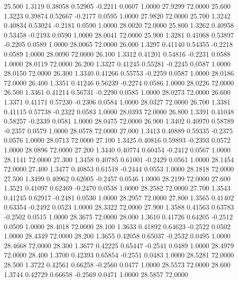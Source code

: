   25.500   1.3119   0.38058   0.52905  -0.2211   0.0607   1.0000  27.9299  72.0000
  25.600   1.3223   0.39874   0.52667  -0.2177   0.0595   1.0000  27.9820  72.0000
  25.700   1.3242   0.40834   0.53024  -0.2181   0.0590   1.0000  28.0020  72.0000
  25.800   1.3262   0.40958   0.53458  -0.2193   0.0590   1.0000  28.0041  72.0000
  25.900   1.3281   0.41068   0.53897  -0.2205   0.0589   1.0000  28.0065  72.0000
  26.000   1.3297   0.41140   0.54355  -0.2218   0.0589   1.0000  28.0090  72.0000
  26.100   1.3312   0.41201   0.54816  -0.2231   0.0588   1.0000  28.0119  72.0000
  26.200   1.3327   0.41245   0.55281  -0.2245   0.0587   1.0000  28.0150  72.0000
  26.300   1.3340   0.41266   0.55753  -0.2259   0.0587   1.0000  28.0186  72.0000
  26.400   1.3351   0.41246   0.56239  -0.2274   0.0586   1.0000  28.0226  72.0000
  26.500   1.3361   0.41214   0.56731  -0.2290   0.0585   1.0000  28.0273  72.0000
  26.600   1.3371   0.41171   0.57230  -0.2306   0.0584   1.0000  28.0327  72.0000
  26.700   1.3381   0.41115   0.57738  -0.2322   0.0583   1.0000  28.0393  72.0000
  26.800   1.3391   0.41048   0.58257  -0.2339   0.0581   1.0000  28.0475  72.0000
  26.900   1.3402   0.40970   0.58789  -0.2357   0.0579   1.0000  28.0578  72.0000
  27.000   1.3413   0.40889   0.59335  -0.2375   0.0576   1.0000  28.0713  72.0000
  27.100   1.3425   0.40816   0.59893  -0.2393   0.0572   1.0000  28.0896  72.0000
  27.200   1.3440   0.40774   0.60454  -0.2412   0.0567   1.0000  28.1141  72.0000
  27.300   1.3458   0.40785   0.61001  -0.2429   0.0561   1.0000  28.1454  72.0000
  27.400   1.3477   0.40853   0.61518  -0.2444   0.0553   1.0000  28.1818  72.0000
  27.500   1.3499   0.40962   0.62005  -0.2457   0.0546   1.0000  28.2199  72.0000
  27.600   1.3521   0.41097   0.62469  -0.2470   0.0538   1.0000  28.2582  72.0000
  27.700   1.3543   0.41245   0.62917  -0.2481   0.0530   1.0000  28.2957  72.0000
  27.800   1.3565   0.41402   0.63354  -0.2492   0.0523   1.0000  28.3322  72.0000
  27.900   1.3588   0.41563   0.63783  -0.2502   0.0515   1.0000  28.3675  72.0000
  28.000   1.3610   0.41726   0.64205  -0.2512   0.0509   1.0000  28.4018  72.0000
  28.100   1.3633   0.41892   0.64623  -0.2522   0.0502   1.0000  28.4349  72.0000
  28.200   1.3655   0.42058   0.65037  -0.2532   0.0495   1.0000  28.4668  72.0000
  28.300   1.3677   0.42225   0.65447  -0.2541   0.0489   1.0000  28.4979  72.0000
  28.400   1.3700   0.42393   0.65854  -0.2551   0.0483   1.0000  28.5281  72.0000
  28.500   1.3722   0.42561   0.66258  -0.2560   0.0477   1.0000  28.5573  72.0000
  28.600   1.3744   0.42729   0.66658  -0.2569   0.0471   1.0000  28.5857  72.0000
